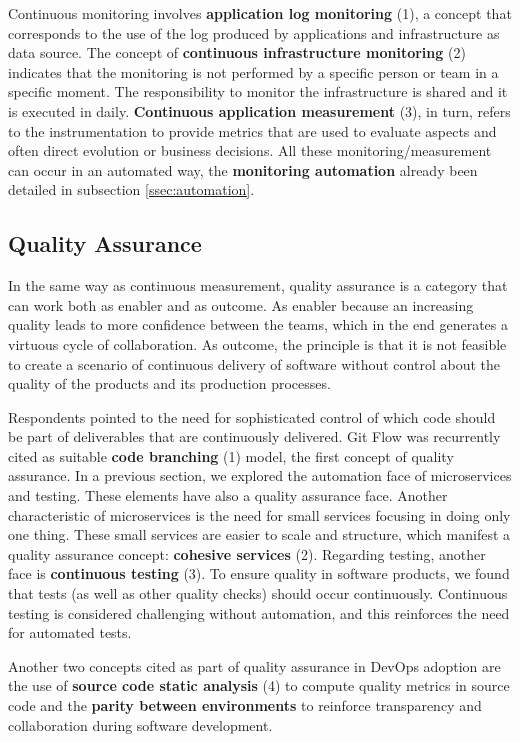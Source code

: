 Continuous monitoring involves \textbf{application log monitoring} (1), a
concept that corresponds to the use of the log produced by
applications and infrastructure as data source. The concept of
\textbf{continuous infrastructure monitoring} (2) indicates that the monitoring
is not performed by a specific person or team in a specific moment. The
responsibility to monitor the infrastructure is shared and it is executed in
daily. \textbf{Continuous application measurement} (3), in turn, refers to
the instrumentation to provide metrics that are used to evaluate aspects and
often direct evolution or business decisions. All these monitoring/measurement
can occur in an automated way, the \textbf{monitoring automation} already been
detailed in subsection \ref{ssec:automation}.

\subsection{Quality Assurance}

In the same way as continuous measurement, quality assurance is a category that
can work both as enabler and as outcome. As enabler because an increasing quality
leads to more confidence between the teams, which in the end generates a virtuous
cycle of collaboration. As outcome, the principle is that it is not
feasible to create a scenario of continuous delivery of software without control
about the quality of the products and its production processes.

Respondents pointed to the need for sophisticated control of which code should
be part of deliverables that are continuously delivered. Git Flow was
recurrently cited as suitable \textbf{code branching} (1) model, the first
concept of quality assurance.
In a previous section, we explored the automation face of
microservices and testing. These elements have also a quality assurance face.
Another characteristic of microservices is the need for small services focusing
in doing only one thing. These small services are easier to scale and
structure, which manifest a quality assurance concept: \textbf{cohesive
services} (2). Regarding testing, another face is \textbf{continuous
testing} (3). To ensure quality in software products, we found that
tests (as well as other quality checks) should occur continuously. Continuous testing
is considered challenging without automation, and this reinforces the need for automated
tests.

Another two concepts cited as part of quality assurance in DevOps adoption are
the use of \textbf{source code static analysis} (4) to compute quality metrics in
source code and the \textbf{parity between environments} to
reinforce transparency and collaboration during software development.

